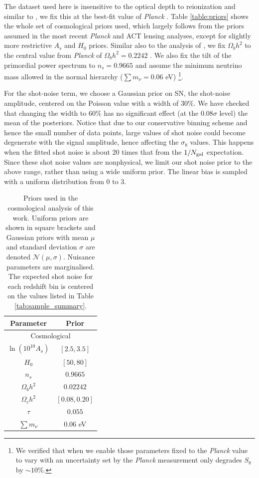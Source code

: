 \documentclass[twocolumn]{aastex631}
\begin{document}
{The dataset used here is insensitive to the optical depth to reionization and similar to \citep{qu2023atacama}, we fix this at the best-fit value of \textit{Planck} \citep{planck2015param}. Table \ref{table:priors} shows the whole set of cosmological priors used, which largely follows from the priors assumed in the most recent \textit{Planck}
and ACT lensing analyses, except for slightly more restrictive $A_s$ and $H_0$ priors. 
Similar also to the analysis of \cite{farren2023atacama}, we fix $\Omega_bh^2$ to the central value from \textit{Planck} of $\Omega_bh^2=0.2242$ \citep{Planck2018Param}.  We also fix the tilt of the primordial power spectrum to $n_s=0.9665$ \citep{Planck2018Param} and assume the minimum neutrino mass allowed in the normal hierarchy ($\sum m_\nu = 0.06$ eV) \footnote{We verified that when we enable those parameters fixed to the \textit{Planck} value to vary with an uncertainty set by the \textit{Planck} measurement only degrades $S_8$ by $\sim10\%$.}. 

For the shot-noise term, we choose a Gaussian prior on SN, the shot-noise amplitude, centered on the Poisson value with a width of $30\%$. We have checked that changing the width to $60\%$ has no significant effect (at the $0.08\sigma$ level) the mean of the posteriors. Notice that due to our conservative binning scheme and hence the small number of data points, large values of shot noise could become degenerate with the signal amplitude, hence affecting the $\sigma_8$ values. This happens when the fitted shot noise is about 20 times that from the $1/N_{\rm gal}$ expectation. Since these shot noise values are nonphysical, we limit our shot noise prior to the above range, rather than using a wide uniform prior.
The linear bias is sampled with a uniform distribution from $0$ to $3$. 

\begin{table}
\centering
\caption{Priors used in the cosmological analysis of this work. Uniform priors are shown in square brackets and Gaussian priors with mean $\mu$ and standard deviation $\sigma$ are denoted $\mathcal{N}(\mu,\sigma)$. Nuisance parameters are marginalised. The expected shot noise for each redshift bin is centered on the values listed in Table \ref{tab:sample_summary}.}
\begin{tabular}{cc}
\hline\hline
Parameter       & Prior      \\ \hline
\multicolumn{2}{c}{Cosmological}\\
$\ln (10^{10}A_s)$ & $[2.5,3.5]$           \\ 
$H_0$           & $[50,80]$        \\ 
$n_s$           & $0.9665$     \\ 
$\Omega_bh^2$   & $0.02242$ \\ 
$\Omega_ch^2$   & $[0.08,0.20]$    \\ 
$\tau$          & $0.055$   \\
$\sum{m_\nu}$   & $0.06$ eV \\ 


\end{tabular}
\end{table}}
\end{document}
